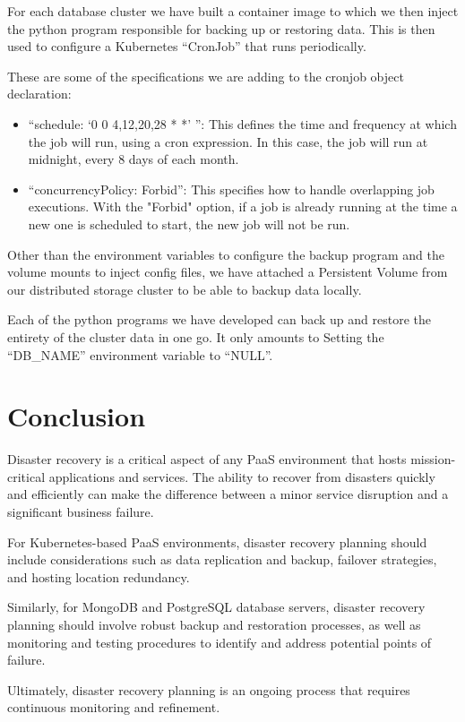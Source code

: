 For each database cluster we have built a container image to which we then inject the python program responsible for backing up or restoring data. This is then used to configure a Kubernetes “CronJob” that runs periodically.

These are some of the specifications we are adding to the cronjob object declaration: 
\begin{itemize}[label={--}]
\item “schedule: ‘0 0 4,12,20,28 * *’ ”: This defines the time and frequency at which the job will run, using a cron expression. In this case, the job will run at midnight, every 8 days of each month. 
\item  “concurrencyPolicy: Forbid”: This specifies how to handle overlapping job executions. With the "Forbid" option, if a job is already running at the time a new one is scheduled to start, the new job will not be run. 
\end{itemize}

Other than the environment variables to configure the backup program and the volume mounts to inject config files, we have attached a Persistent Volume from our distributed storage cluster to be able to backup data locally. 

Each of the python programs we have developed can back up and restore the entirety of the cluster data in one go. It only amounts to Setting the “DB\_NAME” environment variable to “NULL”. 

\newpage

\section*{Conclusion}
Disaster recovery is a critical aspect of any PaaS environment that hosts mission-critical applications and services. The ability to recover from disasters quickly and efficiently can make the difference between a minor service disruption and a significant business failure. 

For Kubernetes-based PaaS environments, disaster recovery planning should include considerations such as data replication and backup, failover strategies, and hosting location redundancy.  

Similarly, for MongoDB and PostgreSQL database servers, disaster recovery planning should involve robust backup and restoration processes, as well as monitoring and testing procedures to identify and address potential points of failure.  

Ultimately, disaster recovery planning is an ongoing process that requires continuous monitoring and refinement. 